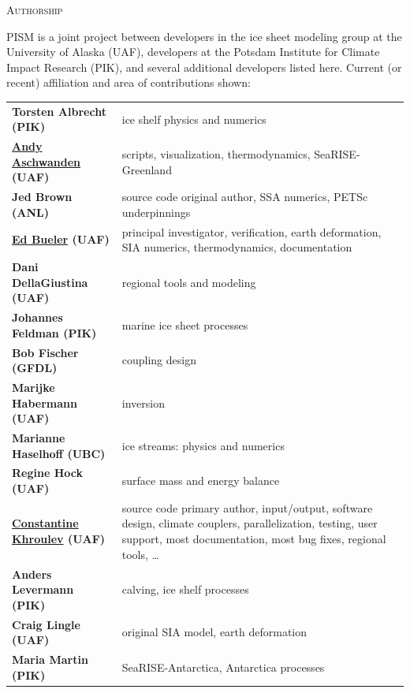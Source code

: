 \documentclass[titlepage,letterpaper,final]{scrartcl}
\begin{document}
\centerline{\textsc{Authorship}}
\bigskip

\normalspacing
PISM is a joint project between developers in the ice sheet modeling group at the University of Alaska (UAF), developers at the Potsdam Institute for Climate Impact Research (PIK), and several additional developers listed here.  Current (or recent) affiliation and area of contributions shown:
\bigskip
\normalspacing

\renewcommand{\arraystretch}{1.3}
\begin{tabular}{ll}
\textbf{Torsten Albrecht (PIK)} & ice shelf physics and numerics \\
\textbf{\underline{Andy Aschwanden} (UAF)} & \begin{minipage}[t]{4in} scripts, visualization, thermodynamics, SeaRISE-Greenland  \end{minipage}  \\
\textbf{Jed Brown (ANL)} & source code original author, SSA numerics, PETSc underpinnings \\
\textbf{\underline{Ed Bueler} (UAF)} & \begin{minipage}[t]{4in} principal investigator, verification, earth deformation, SIA numerics, thermodynamics, documentation  \end{minipage} \\
\textbf{Dani DellaGiustina (UAF)} & regional tools and modeling \\
\textbf{Johannes Feldman (PIK)} & marine ice sheet processes \\
\textbf{Bob Fischer (GFDL)} & coupling design \\
\textbf{Marijke Habermann (UAF)} & inversion\\
\textbf{Marianne Haselhoff (UBC)} & ice streams: physics and numerics\\
\textbf{Regine Hock (UAF)} & surface mass and energy balance \\
\textbf{\underline{Constantine Khroulev} (UAF)} & \begin{minipage}[t]{4in} source code primary author, input/output, software design, climate couplers, parallelization, testing, user support, most documentation, most bug fixes, regional tools, \dots \end{minipage} \\
\textbf{Anders Levermann (PIK)} & calving, ice shelf processes \\
\textbf{Craig Lingle (UAF)} & original SIA model, earth deformation \\
\textbf{Maria Martin (PIK)} & SeaRISE-Antarctica, Antarctica processes \\

\end{tabular}
\end{document}
